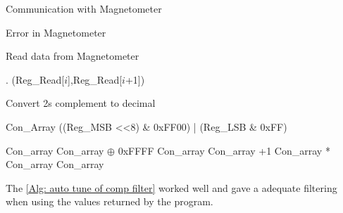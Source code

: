\begin{algorithm}
	\caption{Communication with Magnetometer}\label{Alg: Magnetometer setup}
	\begin{algorithmic}[1]
	  									
	
	\Return Error in Magnetometer
	\EndIf
	
	   											
	 												
	 														
	\EndProcedure
	\end{algorithmic}
\end{algorithm}

\begin{algorithm}
	\caption{Read data from Magnetometer}\label{Alg: read from Magnetometer}
	\begin{algorithmic}[1]
		 .
		 (Reg\_Read[$i$],Reg\_Read[$i$+1]) %
		\EndFor
		\State {}
		\EndWhile
		\EndProcedure
	\end{algorithmic}
\end{algorithm}


\begin{algorithm}
	\caption{Convert 2s complement to decimal}\label{Alg:  2's complement to decimal}
	\begin{algorithmic}[1]
	
	Con\_Array \gets ((Reg\_MSB <<8) \& 0xFF00) | (Reg\_LSB \& 0xFF)
	
	\State Con\_array \gets Con\_array $\oplus$  0xFFFF 
	\State Con\_array \gets Con\_array +1
	\State Con\_array  Con\_array
	\EndIf
	\Return  Con\_array
	\EndFunction
	\end{algorithmic}
\end{algorithm}

The \ref{Alg: auto tune of comp filter} worked well and gave a adequate  filtering when using the values returned by the program.
